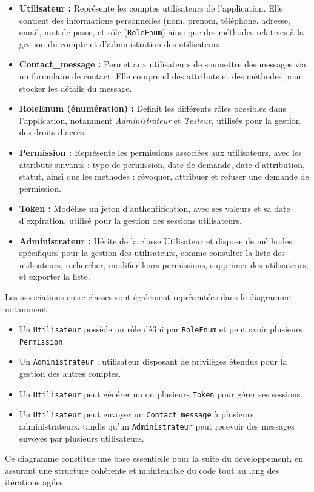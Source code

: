     \begin{itemize}[label=$*$]
       \item \textbf{Utilisateur :} Représente les comptes utilisateurs de l’application. Elle contient des informations personnelles (nom, prénom, téléphone, adresse, email, mot de passe, et rôle (\texttt{RoleEnum}) ainsi que des méthodes relatives à la gestion du compte et d’administration des utilisateurs.
       \item \textbf{Contact\_message :} Permet aux utilisateurs de soumettre des messages via un formulaire de contact. Elle comprend des attributs et des méthodes pour stocker les détails du message.
       \item \textbf{RoleEnum (énumération) :} Définit les différents rôles possibles dans l’application, notamment \textit{Administrateur} et \textit{Testeur}, utilisés pour la gestion des droits d’accès.
       \item \textbf{Permission :} Représente les permissions associées aux utilisateurs, avec les attributs suivants : type de permission, date de demande, date d’attribution, statut, ainsi que les méthodes : révoquer, attribuer et refuser une demande de permission.
       \item \textbf{Token :} Modélise un jeton d’authentification, avec ses valeurs et sa date d’expiration, utilisé pour la gestion des sessions utilisateurs.
       \item \textbf{Administrateur :} Hérite de la classe Utilisateur et dispose de méthodes spécifiques pour la gestion des utilisateurs, comme consulter la liste des utilisateurs, rechercher, modifier leurs permissions, supprimer des utilisateurs, et exporter la liste.
    \end{itemize}
Les associations entre classes sont également représentées dans le diagramme, notamment:
\begin{itemize}[label=$-$, left=0.05cm]
    \item Un \texttt{Utilisateur} possède un rôle défini par \texttt{RoleEnum} et peut avoir plusieurs \texttt{Permission}.
    \item Un \texttt{Administrateur} : utilisateur disposant de privilèges étendus pour la gestion des autres comptes.
    \item Un \texttt{Utilisateur} peut générer un ou plusieurs \texttt{Token} pour gérer ses sessions.
    \item Un \texttt{Utilisateur} peut envoyer un \texttt{Contact\_message} à plusieurs administrateurs, tandis qu’un \texttt{Administrateur} peut recevoir des messages envoyés par plusieurs utilisateurs.
\end{itemize}
Ce diagramme constitue une base essentielle pour la suite du développement, en assurant une structure cohérente et maintenable du code tout au long des itérations agiles.
